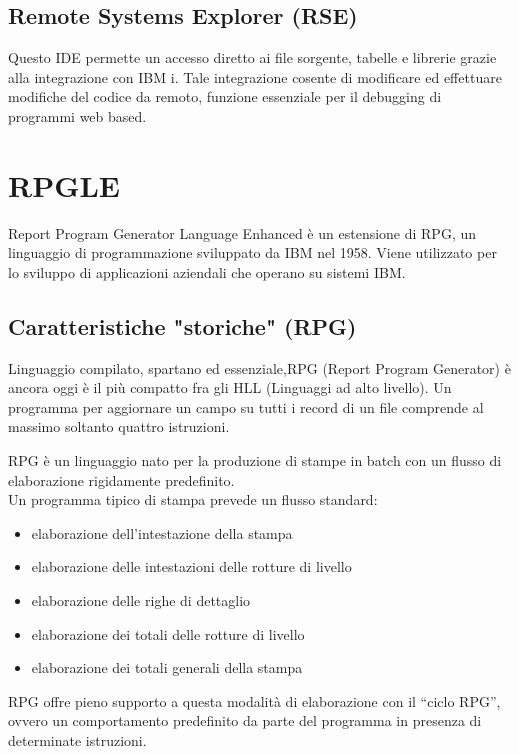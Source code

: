 \documentclass[target=bach,aauheader=,style=]{thud}
\begin{document}
\subsection{Remote Systems Explorer (RSE)}
Questo IDE permette un accesso diretto ai file sorgente, tabelle e librerie grazie alla integrazione con IBM i.
Tale integrazione cosente di modificare ed effettuare modifiche del codice da remoto, funzione essenziale per il debugging di programmi web based.



\section{RPGLE}
Report Program Generator Language Enhanced è un estensione di RPG, un linguaggio di programmazione sviluppato da IBM nel 1958.
Viene utilizzato per lo sviluppo di applicazioni aziendali che operano su sistemi IBM.

\subsection{Caratteristiche "storiche" (RPG)}
Linguaggio compilato, spartano ed essenziale,RPG (Report Program Generator) è ancora oggi è il più compatto fra gli HLL (Linguaggi ad alto livello).
Un programma per aggiornare un campo su tutti i record di un file comprende al massimo soltanto quattro istruzioni.

RPG è un linguaggio nato per la produzione di stampe in batch con un flusso di elaborazione rigidamente predefinito.
\\
Un programma tipico di stampa prevede un flusso standard:
\begin{itemize}
    \setlength{\itemsep}{0pt} %
    \item elaborazione dell’intestazione della stampa
    \item elaborazione delle intestazioni delle rotture di livello
    \item elaborazione delle righe di dettaglio
    \item elaborazione dei totali delle rotture di livello
    \item elaborazione dei totali generali della stampa
\end{itemize}
RPG offre pieno supporto a questa modalità di
elaborazione con il “ciclo RPG”, ovvero un comportamento
predefinito da parte del programma in presenza di
determinate istruzioni.
\end{document}
